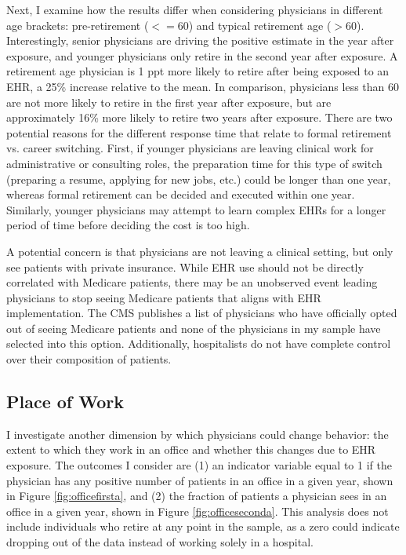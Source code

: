 \documentclass[12pt]{article}
\begin{document}
Next, I examine how the results differ when considering physicians in different age brackets: pre-retirement ($<= 60$) and typical retirement age ($> 60$). Interestingly, senior physicians are driving the positive estimate in the year after exposure, and younger physicians only retire in the second year after exposure. A retirement age physician is 1 ppt more likely to retire after being exposed to an EHR, a 25\% increase relative to the mean. In comparison, physicians less than 60 are not more likely to retire in the first year after exposure, but are approximately 16\% more likely to retire two years after exposure. There are two potential reasons for the different response time that relate to formal retirement vs. career switching. First, if younger physicians are leaving clinical work for administrative or consulting roles, the preparation time for this type of switch (preparing a resume, applying for new jobs, etc.) could be longer than one year, whereas formal retirement can be decided and executed within one year. Similarly, younger physicians may attempt to learn complex EHRs for a longer period of time before deciding the cost is too high. 

A potential concern is that physicians are not leaving a clinical setting, but only see patients with private insurance. While EHR use should not be directly correlated with Medicare patients, there may be an unobserved event leading physicians to stop seeing Medicare patients that aligns with EHR implementation. The CMS publishes a list of physicians who have officially opted out of seeing Medicare patients and none of the physicians in my sample have selected into this option. Additionally, hospitalists do not have complete control over their composition of patients.  


\subsection{Place of Work}

I investigate another dimension by which physicians could change behavior: the extent to which they work in an office and whether this changes due to EHR exposure. The outcomes I consider are (1) an indicator variable equal to 1 if the physician has any positive number of patients in an office in a given year, shown in Figure \ref{fig:officefirsta}, and (2) the fraction of patients a physician sees in an office in a given year, shown in Figure \ref{fig:officeseconda}. This analysis does not include individuals who retire at any point in the sample, as a zero could indicate dropping out of the data instead of working solely in a hospital. 
\end{document}
